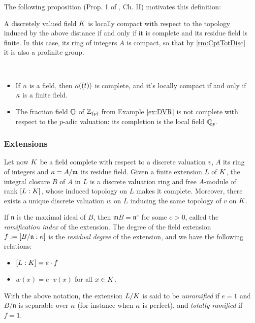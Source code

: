\documentclass[a4paper, oneside]{memoir}
\begin{document}
The following proposition (Prop. 1 of \cite{SerreCL}, Ch. II)
motivates this definition:
\begin{proposition}
    A discretely valued field $K$ is locally compact with respect to the topology induced by the above distance if and only if it is complete and its residue field is finite. In
    this case, its ring of integers $A$ is compact, so that by \ref{rm:CptTotDisc} it is also a profinite group.
\end{proposition}

\begin{example}\
    \begin{itemize}
        \item If $\kappa$ is a field, then $\kappa((t))$ is complete, and it's locally compact if and only if $\kappa$ is a finite field.
        \item The fraction field $\mathbb{Q}$ of $\mathbb{Z}_{(p)}$ from Example \ref{ex:DVR} is not complete with respect to the $p$-adic valuation: its completion is the local field $\mathbb{Q}_p$.
    \end{itemize}
\end{example}

\subsubsection{Extensions}

Let now $K$ be a field complete with respect to a discrete valuation $v$, $A$ its ring of integers and $\kappa=A/\mathfrak{m}$ its residue field. Given a finite extension $L$ of $K$, the integral closure $B$ of $A$ in $L$ is a discrete valuation ring and free $A$-module of rank $[L:K]$, whose induced
topology on $L$ makes it complete. Moreover, there exists a unique discrete valuation $w$ on $L$ inducing the same topology of $v$ on $K$.

If $\mathfrak{n}$ is the maximal ideal of $B$, then $\mathfrak{m}B=\mathfrak{n}^e$ for some $e>0$, called the
\textit{ramification index} of the extension. The degree of the field extension $f:=[B /\mathfrak{n}:\kappa]$
is the \textit{residual degree} of the extension, and we have the following relations:
\begin{itemize}
    \item \( [L:K]=e\cdot f \)
    \item $w(x) = e\cdot v(x)$ for all $x\in K$.
\end{itemize}

\begin{definition}
    With the above notation, the extension $L/K$ is said to be \textit{unramified} if $e=1$ and $B /\mathfrak{n}$ is separable over $\kappa$ (for instance when $\kappa$ is perfect), and \textit{totally ramified} if $f=1$.
\end{definition}
\end{document}
